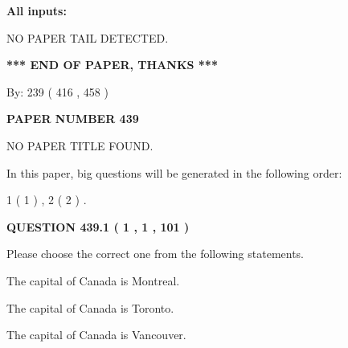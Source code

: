 \documentclass[12pt]{article}
\begin{document}
   
   
   
\noindent{}
   
   
   
   
\noindent\vspace{0.1in}\hspace{-0.08in} {\textbf{\Large{All inputs: }}}
   
   
   
   
\vspace{2.0in} NO PAPER TAIL DETECTED.
   
   
   
   
\vspace{1.0in} 
{\textbf{\large{ *** END OF PAPER, THANKS *** }}} 
   
   
\hspace{1.0in} By: 
 239 ( 416 ,  458 )
   
   
   
   
\newpage 
\setcounter{page}{ 
   439001 } 
   
   
   
   
 {\textbf{ \Large{ PAPER NUMBER  439  }}}
   
   
\vspace{0.2in}
   
   
   
   
   
   
 NO PAPER TITLE FOUND.
   
   
   
\vspace{0.2in}
   
In this paper, big questions will be generated in the following order: 
   
   
   1 ( 1 )
 ,
   2 ( 2 )
 .
  
\vspace{0.2in}
  
{\textbf{\Large{QUESTION
439.1 
 ( 1 , 1 , 101 )
}}}
  
  
Please choose the correct one from the following statements.
 
 
The capital of Canada is Montreal.
 
 
The capital of Canada is Toronto.
 
 
The capital of Canada is Vancouver.
 
\end{document}
